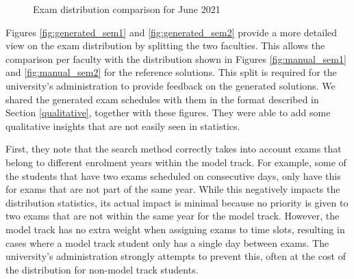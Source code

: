 \begin{figure}[H]
  \centering
  \hfill
  \caption{Exam distribution comparison for June 2021}
  \label{fig:sem2_comparison}
\end{figure}

Figures \ref{fig:generated_sem1} and \ref{fig:generated_sem2} provide a more detailed view on the exam distribution by splitting the two faculties. This allows the comparison per faculty with the distribution shown in Figures \ref{fig:manual_sem1} and \ref{fig:manual_sem2} for the reference solutions. This split is required for the university's administration to provide feedback on the generated solutions. We shared the generated exam schedules with them in the format described in Section \ref{qualitative}, together with these figures. They were able to add some qualitative insights that are not easily seen in statistics. 

First, they note that the search method correctly takes into account exams that belong to different enrolment years within the model track. For example, some of the students that have two exams scheduled on consecutive days, only have this for exams that are not part of the same year. While this negatively impacts the distribution statistics, its actual impact is minimal because no priority is given to two exams that are not within the same year for the model track. However, the model track has no extra weight when assigning exams to time slots, resulting in cases where a model track student only has a single day between exams. The university's administration strongly attempts to prevent this, often at the cost of the distribution for non-model track students. 

